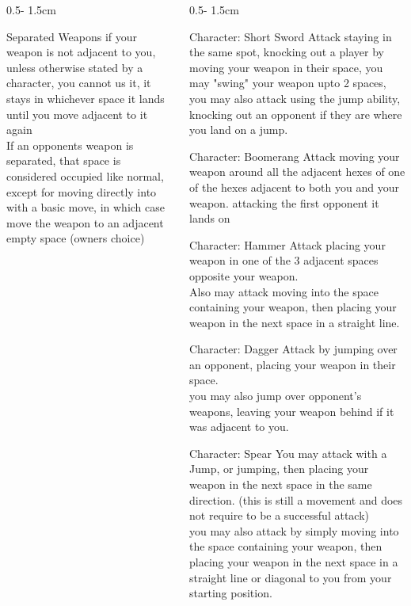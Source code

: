 \documentclass{uioposter}
\begin{document}
\begin{frame}
\begin{columns}[onlytextwidth]
\begin{column}{0.5\textwidth - 1.5cm}
    \begin{alertblock}{Separated Weapons}
        if your weapon is not adjacent to you, unless otherwise stated by a character, you cannot us it, it stays in whichever space it lands until you move adjacent to it again\\
        If an opponents weapon is separated, that space is considered occupied like normal, except for moving directly into with a basic move, in which case move the weapon to an adjacent empty space (owners choice)
    \end{alertblock}

    
\end{column}


\begin{column}{0.5\textwidth - 1.5cm}

    \begin{exampleblock}{Character: Short Sword}
        Attack staying in the same spot, knocking out a player by moving your weapon in their space, you may "swing" your weapon upto 2 spaces, you may also attack using the jump ability, knocking out an opponent if they are where you land on a jump.
    \end{exampleblock}

    \begin{exampleblock}{Character: Boomerang}
        Attack moving your weapon around all the adjacent hexes of one of the hexes adjacent to both you and your weapon. attacking the first opponent it lands on
    \end{exampleblock}

    \begin{exampleblock}{Character: Hammer}
        Attack placing your weapon in one of the 3 adjacent spaces opposite your weapon.\\
        Also may attack moving into the space containing your weapon, then placing your weapon in the next space in a straight line.
    \end{exampleblock}

    \begin{exampleblock}{Character: Dagger}
        Attack by jumping over an opponent, placing your weapon in their space.\\
        you may also jump over opponent's weapons, leaving your weapon behind if it was adjacent to you.
    \end{exampleblock}

    \begin{exampleblock}{Character: Spear}
        You may attack with a Jump, or jumping, then placing your weapon in the next space in the same direction. (this is still a movement and does not require to be a successful attack)\\
        you may also attack by simply moving into the space containing your weapon, then placing your weapon in the next space in a straight line or diagonal to you from your starting position.
    \end{exampleblock}


\end{column}
\end{columns}
\end{frame}
\end{document}
